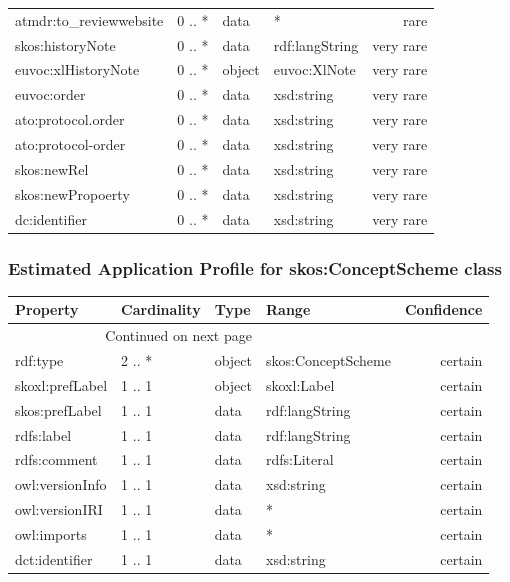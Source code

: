 \documentclass[10pt,a4paper,titlepage,final]{article}
\begin{document}
\begin{tabularx}{\textwidth}{lllXr}
 atmdr:to\_reviewwebsite &      0 .. * &    data &                                                  * &       rare \\
       skos:historyNote &      0 .. * &    data &                                     rdf:langString &  very rare \\
    euvoc:xlHistoryNote &      0 .. * &  object &                                       euvoc:XlNote &  very rare \\
            euvoc:order &      0 .. * &    data &                                         xsd:string &  very rare \\
     ato:protocol.order &      0 .. * &    data &                                         xsd:string &  very rare \\
     ato:protocol-order &      0 .. * &    data &                                         xsd:string &  very rare \\
            skos:newRel &      0 .. * &    data &                                         xsd:string &  very rare \\
      skos:newPropoerty &      0 .. * &    data &                                         xsd:string &  very rare \\
          dc:identifier &      0 .. * &    data &                                         xsd:string &  very rare \\
\end{tabularx}


\subsubsection{Estimated Application Profile for skos:ConceptScheme class}
\begin{tabularx}{\textwidth}{lllXr}
\toprule
        Property & Cardinality &    Type &               Range & Confidence \\
\midrule
\endhead
\midrule
\multicolumn{3}{r}{{Continued on next page}} \\
\midrule
\endfoot

\bottomrule
\endlastfoot
        rdf:type &      2 .. * &  object &  skos:ConceptScheme &    certain \\
 skoxl:prefLabel &      1 .. 1 &  object &         skoxl:Label &    certain \\
  skos:prefLabel &      1 .. 1 &    data &      rdf:langString &    certain \\
      rdfs:label &      1 .. 1 &    data &      rdf:langString &    certain \\
    rdfs:comment &      1 .. 1 &    data &        rdfs:Literal &    certain \\
 owl:versionInfo &      1 .. 1 &    data &          xsd:string &    certain \\
  owl:versionIRI &      1 .. 1 &    data &                   * &    certain \\
     owl:imports &      1 .. 1 &    data &                   * &    certain \\
  dct:identifier &      1 .. 1 &    data &          xsd:string &    certain \\
\end{tabularx}
\end{document}
